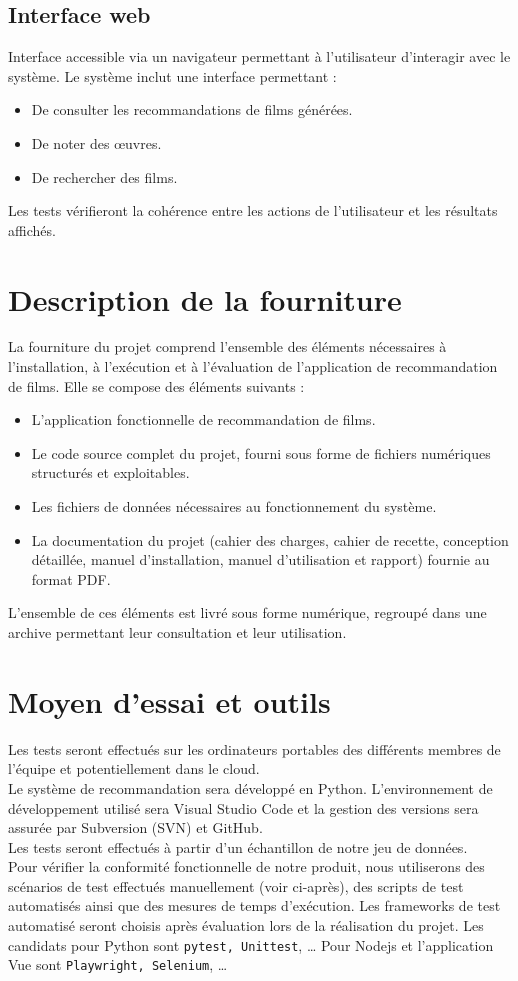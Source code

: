 \documentclass[a4paper,12pt]{report}
\begin{document}
\section{Interface web}
\label{IW1}
Interface accessible via un navigateur permettant à l'utilisateur d'interagir avec le système.
Le système inclut une interface permettant : 
\begin{itemize}
    \item De consulter les recommandations de films générées.
    \item De noter des œuvres.
    \item De rechercher des films.
\end{itemize}
Les tests vérifieront la cohérence entre les actions de l'utilisateur et les résultats affichés.

\chapter{Description de la fourniture}
\label{Four1}
La fourniture du projet comprend l'ensemble des éléments nécessaires à l'installation, à l'exécution et à l'évaluation de l'application de recommandation de films.
Elle se compose des éléments suivants : 
\begin{itemize}
    \item L'application fonctionnelle de recommandation de films.
    \item Le code source complet du projet, fourni sous forme de fichiers numériques structurés et exploitables.
    \item Les fichiers de données nécessaires au fonctionnement du système.
    \item La documentation du projet (cahier des charges, cahier de recette, conception détaillée, manuel d'installation, manuel d'utilisation et rapport) fournie au format PDF.
\end{itemize}
L'ensemble de ces éléments est livré sous forme numérique, regroupé dans une archive permettant leur consultation et leur utilisation.

\chapter{Moyen d’essai et outils}
\label{GV1}
Les tests seront effectués sur les ordinateurs portables des différents membres de l’équipe et potentiellement dans le cloud.\\
Le système de recommandation sera développé en Python. L’environnement de développement utilisé sera Visual Studio Code et la gestion des versions sera assurée par  Subversion (SVN) et GitHub.\\
Les tests seront effectués à partir d’un échantillon de notre jeu de données.\\
Pour vérifier la conformité fonctionnelle de notre produit, nous utiliserons des scénarios de test effectués manuellement (voir ci-après), des scripts de test automatisés ainsi que des mesures de temps d’exécution. Les frameworks de test automatisé seront choisis après évaluation lors de la réalisation du projet. Les candidats pour Python sont \texttt{pytest, Unittest}, …  Pour Nodejs et l’application Vue sont \texttt{Playwright, Selenium}, … 
\end{document}
